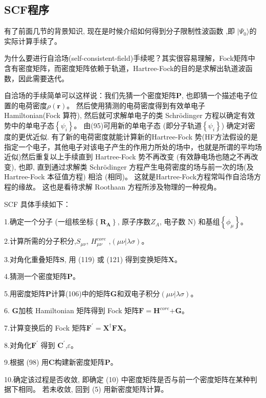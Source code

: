 \documentclass[]{article}
\begin{document}
\subsection{SCF程序}
有了前面几节的背景知识, 现在是时候介绍如何得到分子限制性波函数 ,即 $|\Psi_0\rangle$的实际计算手续了。

为什么要进行自洽场(self-consistent-field)手续呢？其实很容易理解，Fock矩阵中含有密度矩阵，而密度矩阵依赖于轨道，Hartree-Fock的目的是求解出轨道波函数，因此需要迭代。

自洽场的手续简单可以这样说：我们先猜一个密度矩阵$\mathbf{P}$, 也即猜一个描述电子位置的电荷密度$\rho(\mathbf{r})$。 然后使用猜测的电荷密度得到有效单电子 Hamiltonian(Fock 算符), 然后就可求解单电子的类 Schrödinger 方程以确定有效势中的单电子态$\left\lbrace \psi_i\right\rbrace $。 由(95)可用新的单电子态 (即分子轨道$\left\lbrace \psi_i\right\rbrace $) 确定对密度的更优近似. 有了新的电荷密度就能计算新的Hartree-Fock 势(HF方法假设的是指定一个电子，其他电子对该电子产生的作用力所处的场中，也就是所谓的平均场近似)然后重复以上手续直到 Hartree-Fock 势不再改变 (有效静电场也随之不再改变), 也即, 直到通过求解类 Schrödinger 方程产生电荷密度的场与前一次的场(及 Hartree-Fock 本征值方程) 相洽 (相同)。 这就是Hartree-Fock方程常叫作自洽场方程的缘故。 这也是看待求解 Roothaan 方程所涉及物理的一种视角。

SCF 具体手续如下：

1.确定一个分子 (一组核坐标$\left\lbrace \mathbf{R_A}\right\rbrace $, 原子序数$Z_A$, 电子数 N) 和基组$\left\lbrace \phi_{\mu}\right\rbrace $。

2.计算所需的分子积分,$S_{\mu\nu}$, $H^{core}_{\mu\nu}$ ,$(\mu\nu|\lambda\sigma)$。

3.对角化重叠矩阵$\mathbf{S}$, 用 (119) 或 (121) 得到变换矩阵$\mathbf{X}$。

4.猜测一个密度矩阵$\mathbf{P}$。

5.用密度矩阵$\mathbf{P}$计算(106)中的矩阵$\mathbf{G}$和双电子积分$(\mu\nu|\lambda\sigma)$。

6. $\mathbf{G}$加核 Hamiltonian 矩阵得到 Fock 矩阵$\mathbf{F=H}^{core}\mathbf{+G}$。

7.计算变换后的 Fock 矩阵$\mathbf{F^{\prime}}=\mathbf{X^{\dagger}FX}$。

8.对角化$\mathbf{F^{\prime}}$ 得到 $\mathbf{C^{\prime}}$,$\varepsilon$。

9.根据 (98) 用$\mathbf{C}$构建新密度矩阵$\mathbf{P}$。

10.确定该过程是否收敛, 即确定 (10) 中密度矩阵是否与前一个密度矩阵在某种判据下相同。 若未收敛, 回到 (5) 用新密度矩阵计算。
\end{document}
